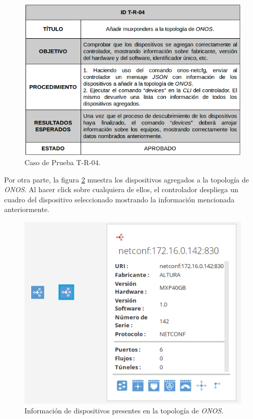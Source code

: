 \begin{figure}[H]
	\centering
	\includegraphics[scale=0.6]{Figures/test4.png}
	\caption{Caso de Prueba T-R-04.}
	\label{fig:test4}
  \end{figure}

  Por otra parte, la figura \ref{fig:test4_consulta} muestra los dispositivos agregados a la topología de \textit{ONOS}. Al hacer click sobre cualquiera de ellos, el controlador despliega un cuadro del dispositivo seleccionado mostrando la información mencionada anteriormente.

  \begin{figure}[H]
	\centering
	\includegraphics[scale=0.5]{Figures/test4_consulta.png}
	\caption{Información de dispositivos presentes en la topología de \textit{ONOS}.}
	\label{fig:test4_consulta}
  \end{figure}

